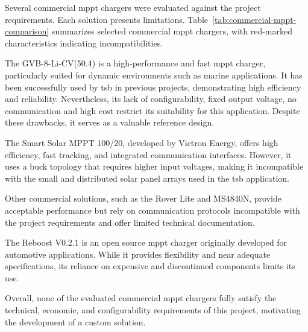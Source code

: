 Several commercial \ac{mppt} chargers were evaluated against the project requirements. Each solution presents limitations. Table~\ref{tab:commercial-mppt-comparison} summarizes selected commercial \acs{mppt} chargers, with red-marked characteristics indicating incompatibilities.

The GVB-8-Li-CV(50.4) is a high-performance and fast \ac{mppt} charger, particularly suited for dynamic environments such as marine applications. It has been successfully used by \acs{tsb} in previous projects, demonstrating high efficiency and reliability. Nevertheless, its lack of configurability, fixed output voltage, no communication and high cost restrict its suitability for this application. Despite these drawbacks, it serves as a valuable reference design.

The Smart Solar MPPT 100/20, developed by Victron Energy, offers high efficiency, fast tracking, and integrated communication interfaces. However, it uses a buck topology that requires higher input voltages, making it incompatible with the small and distributed solar panel arrays used in the \acs{tsb} application.

Other commercial solutions, such as the Rover Lite and MS4840N, provide acceptable performance but rely on communication protocols incompatible with the project requirements and offer limited technical documentation.

The Reboost V0.2.1 is an open source \ac{mppt} charger originally developed for automotive applications. While it provides flexibility and near adequate specifications, its reliance on expensive and discontinued components limits its use.

Overall, none of the evaluated commercial \ac{mppt} chargers fully satisfy the technical, economic, and configurability requirements of this project, motivating the development of a custom solution.

